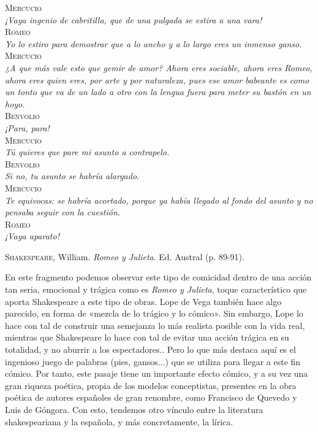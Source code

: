 \documentclass[12pt,a4paper]{article}
\begin{document}
\textsc{Mercucio}\\
\indent\textit{¡Vaya ingenio de cabritilla, que de una pulgada se estira a una vara!}\\
\textsc{Romeo}\\
\indent\textit{Yo lo estiro para demostrar que a lo ancho y a lo largo eres un inmenso ganso.}\\
\textsc{Mercucio}\\
\indent\textit{¿A que más vale esto que gemir de amor? Ahora eres sociable, ahora eres Romeo, ahora eres quien eres, por arte y por naturaleza, pues ese amor babeante es como un tonto que va de un lado a otro con la lengua fuera para meter su bastón en un hoyo.}\\
\textsc{Benvolio}\\
\indent\textit{¡Para, para!}\\
\textsc{Mercucio}\\
\indent\textit{Tú quieres que pare mi asunto a contrapelo.}\\
\textsc{Benvolio}\\
\indent\textit{Si no, tu asunto se habría alargado.}\\
\textsc{Mercucio}\\
\indent\textit{Te equivocas: se habría acortado, porque ya había llegado al fondo del asunto  y no pensaba seguir con la cuestión.}\\
\textsc{Romeo}\\
\indent\textit{¡Vaya aparato!}
\begin{flushright}
	\textsc{Shakespeare}, William. \textit{Romeo y Julieta}. Ed. Austral (p. 89-91).\\
\end{flushright}

En este fragmento podemos observar este tipo de comicidad dentro de una acción tan seria, emocional y trágica como es \textit{Romeo y Julieta}, toque característico que aporta Shakespeare a este tipo de obras. Lope de Vega también hace algo parecido, en forma de «mezcla de lo trágico y lo cómico». Sin embargo, Lope lo hace con tal de construir una semejanza lo más realista posible con la vida real, mientras que Shakespeare lo hace con tal de evitar una acción trágica en su totalidad, y no aburrir a los espectadores.. Pero lo que más destaca aquí es el ingenioso juego de palabras (pies, gansos...) que se utiliza para llegar a este fin cómico. Por tanto, este pasaje tiene un importante efecto cómico, y a su vez una gran riqueza poética, propia de los modelos conceptistas, presentes en la obra poética de autores españoles de gran renombre, como Francisco de Quevedo y Luis de Góngora. Con esto, tendemos otro vínculo entre la literatura shakespeariana y la española, y más concretamente, la lírica.\\
\end{document}
